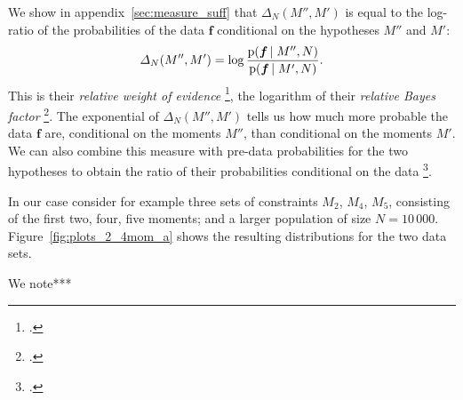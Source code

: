 \documentclass[\ifafour a4paper,12pt,\else a5paper,10pt,\fi%
onecolumn,oneside,article,%
british%
]{memoir}
\theoremstyle{remark}
\theoremstyle{innote}
\newcommand*{\citep}{\footcites}
\newcommand*{\pf}{\mathrm{p}}%
\renewcommand*{\|}{\nonscript\,\vert\nonscript\;\mathopen{}}
\newcommand*{\sect}{\S}%
\newcommand*{\chap}{ch.}%
\newcommand*{\chaps}{chs}%
\newcommand*{\cf}{{cf.}}
\newcommand*{\yff}{f}
\newcommand*{\yf}{\bm{\yff}}
\newcommand*{\ydi}{\varDelta}
\begin{document}
We show in appendix~\ref{sec:measure_suff} that $\ydi_{N}(M'',M')$ is equal
to the log-ratio of the probabilities of the data $\yf$ conditional on the
hypotheses $M''$ and $M'$:
\begin{equation}
  \label{eq:bayes_factor}
  \ydi_{N}(M'',M') =
  \log\frac{\pf(\yf \| M'',N)}{\pf(\yf \| M',N)}.
\end{equation}
This is their \emph{relative weight of evidence}
\citep[\chap~6]{good1950}{good1985}[\sect~1.4]{osteyeeetal1974}, the
logarithm of their \emph{relative Bayes factor}
\citep[p.~421]{jeffreys1936}[and references
therein]{kassetal1995}. %
The exponential of $\ydi_{N}(M'',M')$ tells us how much more probable the
data $\yf$ are, conditional on the moments $M''$, than conditional on the
moments $M'$. We can also combine this measure with pre-data probabilities
for the two hypotheses to obtain the ratio of their probabilities
conditional on the data \citep[\cf][]{bretthorst2013}.

%
%
% 
%
%

\bigskip

In our case consider for example three sets of constraints $M_{2}$,
$M_{4}$, $M_{5}$, consisting of the first two, four, five moments; and a
larger population of size $N=10\,000$. Figure~\ref{fig:plots_2_4mom_a}
shows the resulting distributions for the two data sets.

We note***
\end{document}
